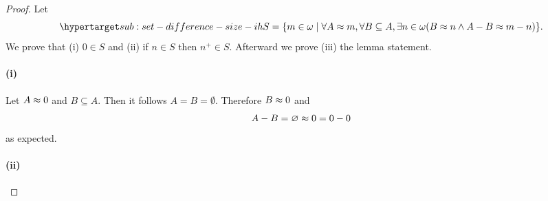 \documentclass{report}
\begin{document}
  \begin{proof}

    Let
      \begin{equation}
        \hyperlabel{sub:set-difference-size-ih}
        S = \{m \in \omega \mid
          \forall A \equin m, \forall B \subseteq A, \exists n
            \in \omega (B \equin n \land A - B \equin m - n)\}.
      \end{equation}
    We prove that (i) $0 \in S$ and (ii) if $n \in S$ then $n^+ \in S$.
    Afterward we prove (iii) the lemma statement.

    \paragraph{(i)}%

      Let $A \approx 0$ and $B \subseteq A$.
      Then it follows $A = B = \emptyset$.
      Therefore $B \approx 0$ and $$A - B = \varnothing \approx 0 = 0 - 0$$ as
        expected.

    \paragraph{(ii)}%


\end{proof}
\end{document}
